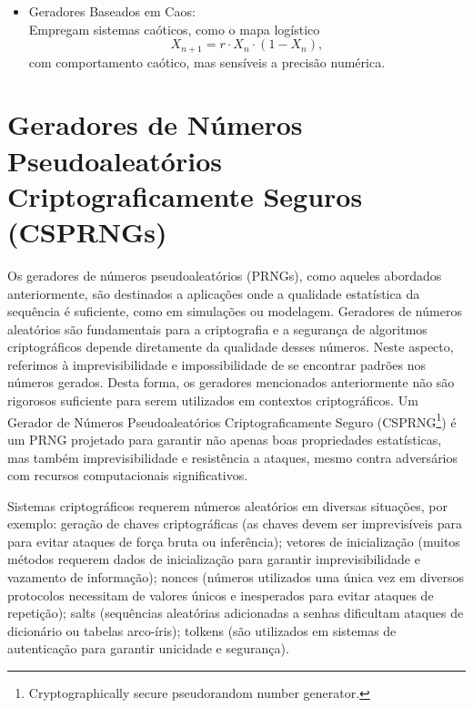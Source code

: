 \begin{itemize}
	Utilizam funções como SHA-256 ($R_i = H(S || C)$)\footnote{Aqui, $S ||
        C$ denota a concatenação das sequências $S$ e $C$. Apesar da similaridade
        visual, é distinta da notação $P \mid\mid Q$ para divergência de
        Kullback-Leibler, apresentada em capítulos futuros.} ou cifras de fluxo como
        ChaCha ($R_i = \text{ChaCha}(K, C)$), 
	sendo seguras para criptografia, porém mais lentas.
    \item Geradores Baseados em Caos: \\
	Empregam sistemas caóticos, como o mapa logístico 
	\begin{equation}
	    X_{n+1} = r \cdot X_n \cdot (1 - X_n) ,
	\end{equation}
	com comportamento caótico, mas sensíveis a precisão numérica.
\end{itemize}





\section{Geradores de Números Pseudoaleatórios Criptograficamente Seguros (CSPRNGs)}
\label{sec:csprng}

Os geradores de números pseudoaleatórios (PRNGs), como aqueles abordados
anteriormente, são destinados a aplicações onde a qualidade estatística da
sequência é suficiente, como em simulações ou modelagem. Geradores de números
aleatórios são fundamentais para a criptografia e a segurança de algoritmos
criptográficos depende diretamente da qualidade desses números. Neste aspecto,
referimos à imprevisibilidade e impossibilidade de se encontrar padrões nos
números gerados.  Desta forma, os geradores mencionados anteriormente não são
rigorosos suficiente para serem utilizados em contextos criptográficos. Um
Gerador de Números Pseudoaleatórios Criptograficamente Seguro (CSPRNG\footnote{Cryptographically secure pseudorandom number generator.})
é um PRNG projetado para garantir não apenas boas propriedades estatísticas,
mas também imprevisibilidade e resistência a ataques, mesmo contra adversários
com recursos computacionais significativos.

Sistemas criptográficos requerem números aleatórios em diversas situações, por
exemplo: geração de chaves criptográficas (as chaves devem ser imprevisíveis
para para evitar ataques de força bruta ou inferência); vetores de
inicialização (muitos métodos requerem dados de inicialização para garantir
imprevisibilidade e vazamento de informação); nonces (números utilizados uma
única vez em diversos protocolos necessitam de valores únicos e inesperados
para evitar ataques de repetição); salts (sequências aleatórias adicionadas a
senhas dificultam ataques de dicionário ou tabelas arco-íris); tolkens (são
utilizados em sistemas de autenticação para garantir unicidade e segurança).

